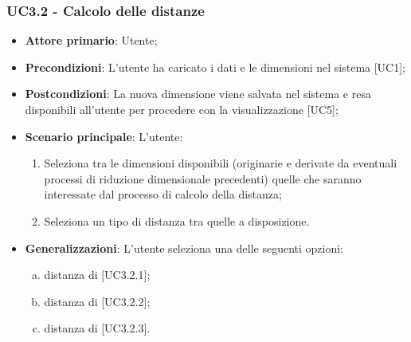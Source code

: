 \subsubsection{UC3.2 - Calcolo delle distanze}
\begin{itemize}
	\item \textbf{Attore primario}: Utente;
	\item \textbf{Precondizioni}: L'utente ha caricato i dati e le dimensioni nel sistema [UC1];
	\item \textbf{Postcondizioni}: La nuova dimensione viene salvata nel sistema e resa disponibili all'utente per procedere con la visualizzazione [UC5];

	\item \textbf{Scenario principale}: L'utente:
		\begin{enumerate}
			\item Seleziona tra le dimensioni disponibili (originarie e derivate da eventuali processi di riduzione dimensionale precedenti) quelle che saranno interessate dal processo di calcolo della distanza;
			\item Seleziona un tipo di distanza tra quelle a disposizione.
		\end{enumerate}			
	 
	
	\item \textbf{Generalizzazioni}: L'utente seleziona una delle seguenti opzioni:
	
	\begin{enumerate}[(a)]
		\item distanza di  [UC3.2.1];
		\item distanza di  [UC3.2.2];
		\item distanza di  [UC3.2.3].
	\end{enumerate}
\end{itemize}